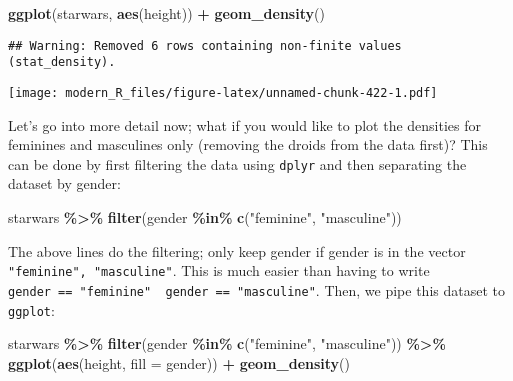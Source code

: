 \documentclass[
]{article}
\newenvironment{Shaded}{\begin{snugshade}}{\end{snugshade}}
\newcommand{\DataTypeTok}[1]{\textcolor[rgb]{0.13,0.29,0.53}{#1}}
\newcommand{\KeywordTok}[1]{\textcolor[rgb]{0.13,0.29,0.53}{\textbf{#1}}}
\newcommand{\NormalTok}[1]{#1}
\newcommand{\OperatorTok}[1]{\textcolor[rgb]{0.81,0.36,0.00}{\textbf{#1}}}
\newcommand{\StringTok}[1]{\textcolor[rgb]{0.31,0.60,0.02}{#1}}
\begin{document}
\begin{Shaded}
\begin{Highlighting}[]
\KeywordTok{ggplot}\NormalTok{(starwars, }\KeywordTok{aes}\NormalTok{(height)) }\OperatorTok{+}
\StringTok{  }\KeywordTok{geom\_density}\NormalTok{()}
\end{Highlighting}
\end{Shaded}

\begin{verbatim}
## Warning: Removed 6 rows containing non-finite values (stat_density).
\end{verbatim}

\texttt{[image: modern\_R\_files/figure-latex/unnamed-chunk-422-1.pdf]}

Let's go into more detail now; what if you would like to plot the densities for feminines and masculines
only (removing the droids from the data first)? This can be done by first filtering the data using
\texttt{dplyr} and then separating the dataset by gender:

\begin{Shaded}
\begin{Highlighting}[]
\NormalTok{starwars }\OperatorTok{\%\textgreater{}\%}
\StringTok{  }\KeywordTok{filter}\NormalTok{(gender }\OperatorTok{\%in\%}\StringTok{ }\KeywordTok{c}\NormalTok{(}\StringTok{"feminine"}\NormalTok{, }\StringTok{"masculine"}\NormalTok{))}
\end{Highlighting}
\end{Shaded}

The above lines do the filtering; only keep gender if gender is in the vector \texttt{"feminine",\ "masculine"}.
This is much easier than having to write \texttt{gender\ ==\ "feminine"\ \textbar{}\ gender\ ==\ "masculine"}. Then, we pipe
this dataset to \texttt{ggplot}:

\begin{Shaded}
\begin{Highlighting}[]
\NormalTok{starwars }\OperatorTok{\%\textgreater{}\%}
\StringTok{  }\KeywordTok{filter}\NormalTok{(gender }\OperatorTok{\%in\%}\StringTok{ }\KeywordTok{c}\NormalTok{(}\StringTok{"feminine"}\NormalTok{, }\StringTok{"masculine"}\NormalTok{)) }\OperatorTok{\%\textgreater{}\%}
\StringTok{  }\KeywordTok{ggplot}\NormalTok{(}\KeywordTok{aes}\NormalTok{(height, }\DataTypeTok{fill =}\NormalTok{ gender)) }\OperatorTok{+}
\StringTok{  }\KeywordTok{geom\_density}\NormalTok{()}
\end{Highlighting}
\end{Shaded}
\end{document}
